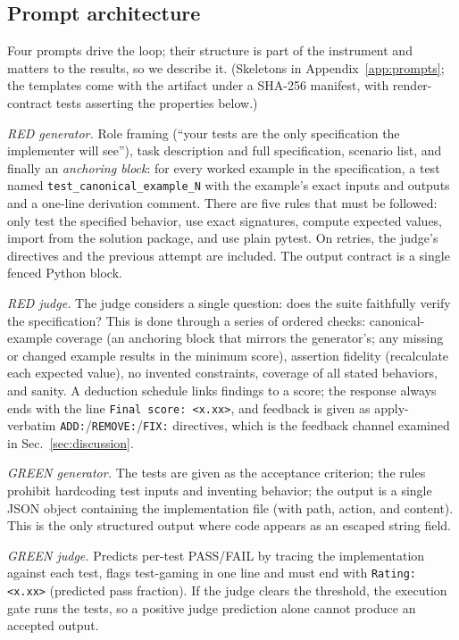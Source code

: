 \subsection{Prompt architecture}
\label{sec:prompts}

Four prompts drive the loop; their structure is part of the instrument and matters to the
results, so we describe it. (Skeletons in Appendix~\ref{app:prompts}; the templates come with
the artifact under a SHA-256 manifest, with render-contract tests asserting the properties
below.)

\emph{RED generator.} Role framing (``your tests are the only specification the implementer
will see''), task description and full specification, scenario list, and finally an
\emph{anchoring block}: for every worked example in the specification, a test named
\texttt{test\_canonical\_example\_N} with the example's exact inputs and outputs and a one-line
derivation comment. There are five rules that must be followed: only test the specified behavior,
use exact signatures, compute expected values, import from the solution package, and use
plain pytest. On retries, the judge's directives and the previous attempt are included. The output
contract is a single fenced Python block.

\emph{RED judge.} The judge considers a single question: does the suite faithfully verify the
specification? This is done through a series of ordered checks: canonical-example coverage (an
anchoring block that mirrors the generator's; any missing or changed example results in the
minimum score), assertion fidelity (recalculate each expected value), no invented constraints,
coverage of all stated behaviors, and sanity. A deduction schedule links findings to a score; the
response always ends with the line \texttt{Final score: <x.xx>}, and feedback is given as
apply-verbatim \texttt{ADD:}/\texttt{REMOVE:}/\texttt{FIX:} directives, which is the feedback
channel examined in Sec.~\ref{sec:discussion}.

\emph{GREEN generator.} The tests are given as the acceptance criterion; the rules prohibit
hardcoding test inputs and inventing behavior; the output is a single JSON object containing the
implementation file (with path, action, and content). This is the only structured output where
code appears as an escaped string field.

\emph{GREEN judge.} Predicts per-test PASS/FAIL by tracing the implementation against each
test, flags test-gaming in one line and must end with \texttt{Rating: <x.xx>} (predicted pass
fraction). If the judge clears the threshold, the execution gate runs the tests, so a positive
judge prediction alone cannot produce an accepted output.

